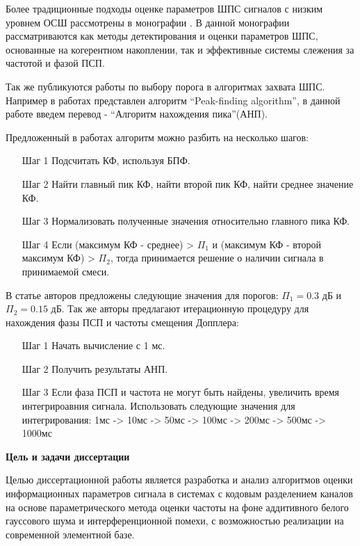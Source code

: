 Более традиционные подходы оценке параметров ШПС сигналов с низким уровнем ОСШ рассмотрены в монографии \cite{ziedan-book}.
В данной монографии рассматриваются как методы детектирования и оценки параметров ШПС, основанные на когерентном накоплении, так и эффективные
системы слежения за частотой и фазой ПСП.

Так же публикуются работы по выбору порога в алгоритмах захвата ШПС. Например в работах \cite{2max_ieee, 2max_article} представлен алгоритм
\textquotedblleft{Peak-finding algorithm}\textquotedblright,
в данной работе введем перевод -
\textquotedblleft{Алгоритм нахождения пика}\textquotedblright (АНП). 

Предложенный в работах алгоритм можно разбить на несколько шагов:
\begin{itemize}
\item[Шаг 1] Подсчитать КФ, используя БПФ.
\item[Шаг 2] Найти главный пик КФ, найти второй пик КФ, найти среднее значение КФ.
\item[Шаг 3] Нормализовать полученные значения относительно главного пика КФ.
\item[Шаг 4] Если (максимум КФ - среднее) > ${\Pi_1}$ и (максимум КФ - 
	второй максимум КФ) > ${\Pi_2}$, тогда принимается решение о наличии сигнала в принимаемой смеси. 
\end{itemize}

В статье авторов \cite{2max_ieee} предложены следующие значения для порогов:
${\Pi_1} = 0.3$ дБ и  ${\Pi_2} = 0.15$ дБ. Так же авторы предлагают итерационную процедуру для нахождения фазы ПСП и частоты смещения Допплера:
\begin{itemize}
\item[Шаг 1] Начать вычисление с 1 мс.
\item[Шаг 2] Получить результаты АНП.
\item[Шаг 3] Если фаза ПСП и частота не могут быть найдены, увеличить время интегрироавния сигнала.
	Использовать следующие значения для интегрирования: 1мс -> 10мс -> 50мс -> 100мс -> 200мс -> 500мс -> 1000мс
\end{itemize}

{\bf{Цель и задачи диссертации}}

Целью диссертационной работы является разработка и анализ алгоритмов оценки информационных параметров сигнала в системах с кодовым разделением каналов на основе
параметрического метода оценки частоты на фоне аддитивного белого гауссового шума и интерференционной помехи,
с возможностью реализации на современной элементной базе.

